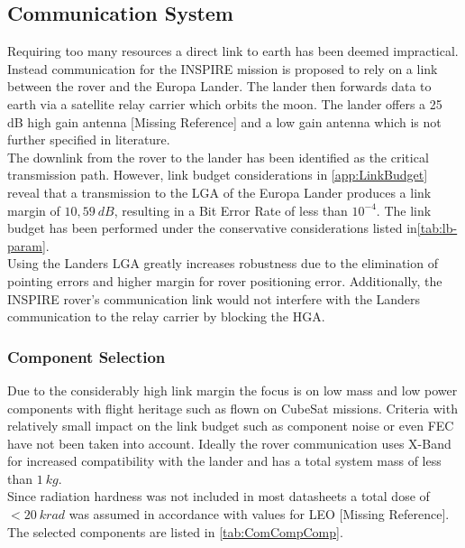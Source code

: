\subsection{Communication System}
Requiring too many resources a direct link to earth has been deemed impractical. Instead communication for the INSPIRE mission is proposed to rely on a link between the rover and the Europa Lander. The lander then forwards data to earth via a satellite relay carrier which orbits the moon. The lander offers a 25 dB high gain antenna [Missing Reference] and a low gain antenna which is not further specified in literature.\\

The downlink from the rover to the lander has been identified as the critical transmission path. However, link budget considerations in \autoref{app:LinkBudget} reveal that a transmission to the LGA of the Europa Lander produces a link margin of $10,59\ dB$, resulting in a Bit Error Rate of less than $10^{-4}$. The link budget has been performed under the conservative considerations listed in\autoref{tab:lb-param}.\\

Using the Landers LGA greatly increases robustness due to the elimination of pointing errors and higher margin for rover positioning error. Additionally, the INSPIRE rover’s communication link would not interfere with the Landers communication to the relay carrier by blocking the HGA.

\subsubsection{Component Selection}

Due to the considerably high link margin the focus is on low mass and low power components with flight heritage such as flown on CubeSat missions. Criteria with relatively small impact on the link budget such as component noise or even FEC have not been taken into account. Ideally the rover communication uses X-Band for increased compatibility with the lander and has a total system mass of less than $1\ kg$. \\
Since radiation hardness was not included in most datasheets a total dose of $<20\ krad$ was assumed in accordance with values for LEO [Missing Reference]. \\

The selected components are listed in \autoref{tab:ComCompComp}. 

